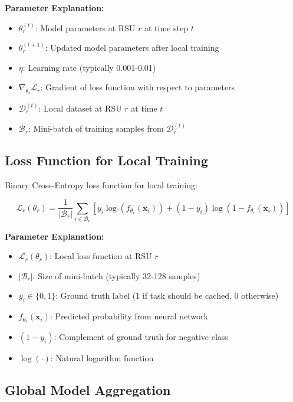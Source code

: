 \documentclass[11pt]{article}
\begin{document}
\textbf{Parameter Explanation:}
\begin{itemize}
    \item $\theta_r^{(t)}$: Model parameters at RSU $r$ at time step $t$
    \item $\theta_r^{(t+1)}$: Updated model parameters after local training
    \item $\eta$: Learning rate (typically 0.001-0.01)
    \item $\nabla_{\theta_r} \mathcal{L}_r$: Gradient of loss function with respect to parameters
    \item $\mathcal{D}_r^{(t)}$: Local dataset at RSU $r$ at time $t$
    \item $\mathcal{B}_r$: Mini-batch of training samples from $\mathcal{D}_r^{(t)}$
\end{itemize}

\subsection{Loss Function for Local Training}

Binary Cross-Entropy loss function for local training:

\begin{equation}
\mathcal{L}_r(\theta_r) = \frac{1}{|\mathcal{B}_r|} \sum_{i \in \mathcal{B}_r} \left[ y_i \log(f_{\theta_r}(\mathbf{x}_i)) + (1-y_i) \log(1-f_{\theta_r}(\mathbf{x}_i)) \right]
\label{eq:loss_function}
\end{equation}

\textbf{Parameter Explanation:}
\begin{itemize}
    \item $\mathcal{L}_r(\theta_r)$: Local loss function at RSU $r$
    \item $|\mathcal{B}_r|$: Size of mini-batch (typically 32-128 samples)
    \item $y_i \in \{0, 1\}$: Ground truth label (1 if task should be cached, 0 otherwise)
    \item $f_{\theta_r}(\mathbf{x}_i)$: Predicted probability from neural network
    \item $(1-y_i)$: Complement of ground truth for negative class
    \item $\log(\cdot)$: Natural logarithm function
\end{itemize}

\subsection{Global Model Aggregation}
\end{document}
